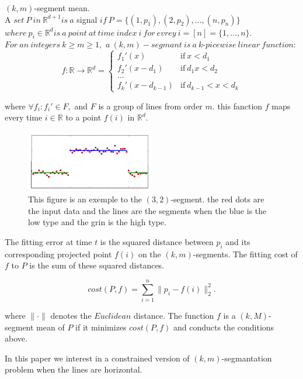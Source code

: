 \documentclass{vldb}
\begin{document}
\begin{definition} $(k,m)$-segment mean.\\
A $set\ P\ in\ \mathbb{R}^{d+1} is\ a$ signal  
$if\ P = \lbrace(1, p_1),(2, p_2),...,(n, p_n)\rbrace$ $where\ p_i\in\mathbb{R}^d is\ a\ point\ at\ time\ index\ i\ for\ evrey\ 
i=[n]=\lbrace1,...,n\rbrace.$
$For\ an\ integers\ k\geq m\geq1,$
$a\ (k,m)-segmant\ is\ a\ k$-$picewise\ linear\ function:$
\[
f:\mathbb{R}\rightarrow\mathbb{R}^d = 
\begin{cases}
  \phantom{}f_1'(x) & \text{if}\ x<d_1 \\
  f_2'(x-d_1)        & \text{if}\ d_1x<d_2\\
  ...\\
  f_k'(x-d_{k-1})    & \text{if}\ d_{k-1}<x<d_k
\end{cases}
\]


where $\forall f_i : f_i' \in F,$ and $F$ is a group of lines from order $m$.
this fanction $f$ maps every time $i\in \mathbb{R}$ to a point $f(i)$ in $\mathbb{R}^d$.
\begin{figure}[H]

    \includegraphics[width=0.5\textwidth]{12.png}
      \caption{This figure is an exemple to the $(3,2)$-segment. the red dots are the input data and the lines are the segments when the blue is the low type and the grin is the high type. 
      }
  \centering
\end{figure}

The fitting error at time $t$ is the squared distance
between $p_i$ and its corresponding projected point $f(i)$ on the $(k,m)$-segments.
The fitting cost of $f$ to $P$ is the sum of these squared distances.

\[
cost(P,f) = \sum_{i=1}^{n}\parallel p_i-f(i)\parallel_{2}^{2}.
\]

where $\parallel\cdot\parallel$ denotes the $Euclidean$ distance. 
The function $f$ is a $(k,M)$-segment mean of $P$ if it minimizes $cost(P,f)$ and conducts the conditions above.
\end{definition}

In this paper we interest in a constrained version of $(k,m)$-segmantation problem when the lines are horizontal.
\end{document}

